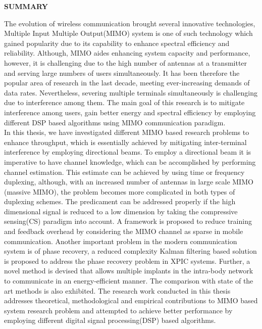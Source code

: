 \clearpage
\begin{centering}
\textbf{SUMMARY}\\
\vspace{\baselineskip}
\end{centering}

The evolution of wireless communication brought several innovative technologies, Multiple Input Multiple Output(MIMO) system is one of such technology which gained popularity due to its capability to enhance spectral efficiency and reliability.  Although, MIMO aides enhancing system capacity and performance, however, it is challenging due to the high number of antennas at a transmitter and serving large numbers of users simultaneously.  It has been therefore the popular area of research in the last decade, meeting ever-increasing demands of data rates.   Nevertheless, severing multiple terminals simultaneously is challenging due to interference among them. The main goal of this research is to mitigate interference among users,  gain better energy and spectral efficiency by employing different DSP based algorithms using MIMO communication paradigm. \\
In this thesis, we have investigated different MIMO based research problems to enhance throughput, which is essentially achieved by mitigating inter-terminal interference by employing directional beams. To employ a directional beam it is imperative to have channel knowledge, which can be accomplished by performing channel estimation. This estimate can be achieved by using time or frequency duplexing, although, with an increased number of antennas in large scale MIMO (massive MIMO), the problem becomes more complicated in both types of duplexing schemes. The predicament can be addressed properly if the high dimensional signal is reduced to a low dimension by taking the compressive sensing(CS) paradigm into account. A framework is proposed to reduce training and feedback overhead by considering the MIMO channel as sparse in mobile communication.  Another important problem in the modern communication system is of phase recovery,  a reduced complexity Kalman filtering based solution is proposed to address the phase recovery problem in XPIC systems. Further, a novel method is devised that allows multiple implants in the intra-body network to communicate in an energy-efficient manner. 
The comparison with state of the art methods is also exhibited. The research work conducted in this thesis addresses theoretical, methodological and empirical contributions to MIMO based system research problem and attempted to achieve better performance by employing different digital signal processing(DSP) based algorithms.